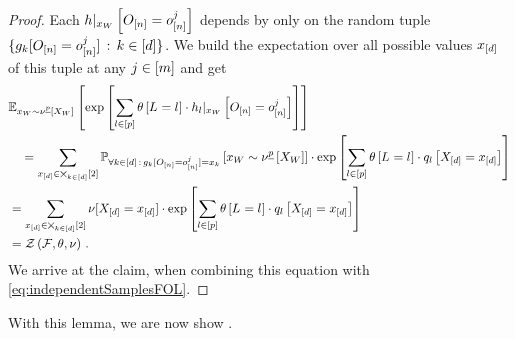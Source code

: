 \begin{proof}
    Each ${h}|_{x_{W}} \left[O_{[n]}=o_{[n]}^{j}\right]$ depends by  only on the random tuple $\{g_{k}[O_{[n]}=o_{[n]}^{j}] \, : \, k\in[d]\}$.
    We build the expectation over all possible values $x_{[d]}$ of this tuple at any $j\in[m]$ and get
    \begin{align*}
        & \mathbb{E}_{x_{W}\sim\nu^{\underline{p}}\left[X_{W}\right]}\left[
            \mathrm{exp}\left[\sum_{l\in[p]} \theta\left[L_{}=l_{}\right] \cdot {h_{l}}|_{x_{W}} \left[O_{[n]}=o_{[n]}^{j}\right]\right]
        \right] \\
        & \quad = \sum_{x_{[d]}\in\bigtimes_{k\in[d]}[2]}
        \mathbb{P}_{\forall{k\in[d]} \, : \, g_{k}[O_{[n]}=o_{[n]}^{j}] =x_{k}}\left[x_{W}\sim\nu^{\underline{p}}\left[X_{W}\right]\right]
        \cdot \mathrm{exp}\left[\sum_{l\in[p]}\theta\left[L_{}=l_{}\right]\cdot q_{l}\left[X_{[d]}=x_{[d]}\right]\right] \\
        & = \sum_{x_{[d]}\in\bigtimes_{k\in[d]}[2]} \nu[X_{[d]}=x_{[d]}] \cdot
        \mathrm{exp}\left[\sum_{l\in[p]} \theta\left[L_{}=l_{}\right] \cdot q_{l}\left[X_{[d]}=x_{[d]}\right]\right]
        \\
        & = \mathcal{Z}\left(\mathcal{F},\theta,\nu\right) \, .
    \end{align*}
    We arrive at the claim, when combining this equation with \eqref{eq:independentSamplesFOL}.
\end{proof}

With this lemma, we are now show .

